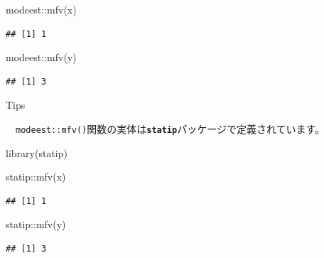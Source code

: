 \documentclass[
  12pt,
]{book}
\newenvironment{Shaded}{\begin{snugshade}}{\end{snugshade}}
\newcommand{\FunctionTok}[1]{\textcolor[rgb]{0.00,0.00,0.00}{#1}}
\newcommand{\NormalTok}[1]{#1}
\newcommand{\SpecialCharTok}[1]{\textcolor[rgb]{0.00,0.00,0.00}{#1}}
\begin{document}
\begin{Shaded}
\begin{Highlighting}[numbers=left,,]
\NormalTok{modeest}\SpecialCharTok{::}\FunctionTok{mfv}\NormalTok{(x)}
\end{Highlighting}
\end{Shaded}

\begin{verbatim}
## [1] 1
\end{verbatim}

\begin{Shaded}
\begin{Highlighting}[numbers=left,,]
\NormalTok{modeest}\SpecialCharTok{::}\FunctionTok{mfv}\NormalTok{(y)}
\end{Highlighting}
\end{Shaded}

\begin{verbatim}
## [1] 3
\end{verbatim}

\begin{tips-box}{Tips}

　\texttt{modeest::mfv()}関数の実体は\textbf{\texttt{statip}}パッケージ\citep{R-statip}で定義されています。

\begin{Shaded}
\begin{Highlighting}[numbers=left,,]
\FunctionTok{library}\NormalTok{(statip)}
\end{Highlighting}
\end{Shaded}

\begin{Shaded}
\begin{Highlighting}[numbers=left,,]
\NormalTok{statip}\SpecialCharTok{::}\FunctionTok{mfv}\NormalTok{(x)}
\end{Highlighting}
\end{Shaded}

\begin{verbatim}
## [1] 1
\end{verbatim}

\begin{Shaded}
\begin{Highlighting}[numbers=left,,]
\NormalTok{statip}\SpecialCharTok{::}\FunctionTok{mfv}\NormalTok{(y)}
\end{Highlighting}
\end{Shaded}

\begin{verbatim}
## [1] 3
\end{verbatim}

\end{tips-box}
\end{document}
